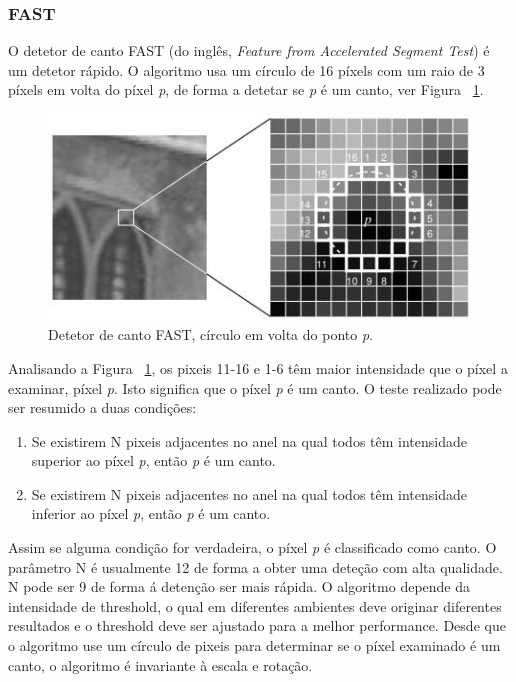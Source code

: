 \subsubsection{FAST}\label{fastsection}

O detetor de canto FAST (do inglês,\textit{ Feature from Accelerated Segment Test}) é um detetor rápido. O algoritmo usa um círculo de 16 píxels com um raio de 3 píxels em volta do píxel \textit{p}, de forma a detetar se \textit{p} é um canto, ver Figura ~\ref{fig:fastcornerdetector}.

\begin{figure}[h!]
	\centering
	\includegraphics[width=0.7\linewidth]{figures/FASTcornerdetector}
	\caption{Detetor de canto FAST, círculo em volta do ponto \textit{p}. \cite{VisualOdometryRodasVehicles}}
	\label{fig:fastcornerdetector}
\end{figure}

Analisando a Figura  ~\ref{fig:fastcornerdetector}, os pixeis 11-16 e 1-6 têm maior intensidade que o píxel a examinar, píxel \textit{p}. Isto significa que o píxel \textit{p} é um canto. O teste realizado pode ser resumido a duas condições:
\begin{enumerate}
	\item Se existirem N pixeis adjacentes no anel na qual todos têm intensidade superior ao píxel \textit{p}, então \textit{p} é um canto.
	\item Se existirem N pixeis adjacentes no anel na qual todos têm intensidade inferior ao píxel \textit{p}, então \textit{p} é um canto.	
\end{enumerate}
Assim se alguma condição for verdadeira, o píxel \textit{p} é classificado como canto. O parâmetro N é usualmente 12 de forma a obter uma deteção com alta qualidade. N pode ser 9 de forma á detenção ser mais rápida. 
O algoritmo depende da intensidade de threshold, o qual em diferentes ambientes deve originar diferentes resultados e o threshold deve ser ajustado para a melhor performance. Desde que o algoritmo use um círculo de pixeis para determinar se o píxel examinado é um canto, o algoritmo é invariante à escala e rotação.


